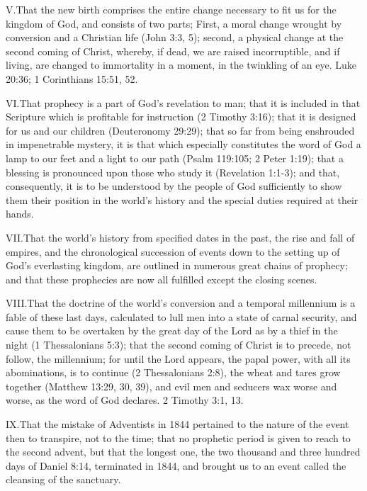 \lettrine{V.} That the new birth comprises the entire change necessary to fit us for the kingdom of God, and consists of two parts; First, a moral change wrought by conversion and a Christian life (John 3:3, 5); second, a physical change at the second coming of Christ, whereby, if dead, we are raised incorruptible, and if living, are changed to immortality in a moment, in the twinkling of an eye. Luke 20:36; 1 Corinthians 15:51, 52.

\lettrine{VI.} That prophecy is a part of God’s revelation to man; that it is included in that Scripture which is profitable for instruction (2 Timothy 3:16); that it is designed for us and our children (Deuteronomy 29:29); that so far from being enshrouded in impenetrable mystery, it is that which especially constitutes the word of God a lamp to our feet and a light to our path (Psalm 119:105; 2 Peter 1:19); that a blessing is pronounced upon those who study it (Revelation 1:1-3); and that, consequently, it is to be understood by the people of God sufficiently to show them their position in the world’s history and the special duties required at their hands.

\lettrine{VII.} That the world’s history from specified dates in the past, the rise and fall of empires, and the chronological succession of events down to the setting up of God’s everlasting kingdom, are outlined in numerous great chains of prophecy; and that these prophecies are now all fulfilled except the closing scenes.

\lettrine{VIII.} That the doctrine of the world’s conversion and a temporal millennium is a fable of these last days, calculated to lull men into a state of carnal security, and cause them to be overtaken by the great day of the Lord as by a thief in the night (1 Thessalonians 5:3); that the second coming of Christ is to precede, not follow, the millennium; for until the Lord appears, the papal power, with all its abominations, is to continue (2 Thessalonians 2:8), the wheat and tares grow together (Matthew 13:29, 30, 39), and evil men and seducers wax worse and worse, as the word of God declares. 2 Timothy 3:1, 13.

\lettrine{IX.} That the mistake of Adventists in 1844 pertained to the nature of the event then to transpire, not to the time; that no prophetic period is given to reach to the second advent, but that the longest one, the two thousand and three hundred days of Daniel 8:14, terminated in 1844, and brought us to an event called the cleansing of the sanctuary.

